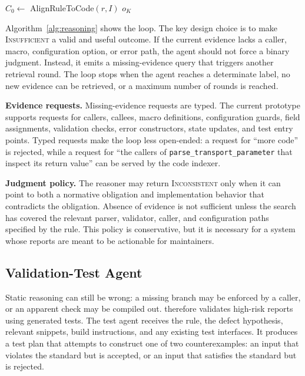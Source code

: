 \begin{algorithm}[t]
\small
\DontPrintSemicolon
{}
$C_0 \leftarrow$ AlignRuleToCode$(r,I)$\;
\Return $o_K$\;
\caption{Evidence-driven consistency reasoning.}
\label{alg:reasoning}
\end{algorithm}

Algorithm~\ref{alg:reasoning} shows the loop. The key design choice is to make
\textsc{Insufficient} a valid and useful outcome. If the current evidence lacks
a caller, macro, configuration option, or error path, the agent should not force
a binary judgment. Instead, it emits a missing-evidence query that triggers
another retrieval round. The loop stops when the agent reaches a determinate
label, no new evidence can be retrieved, or a maximum number of rounds is
reached.

\textbf{Evidence requests.}
Missing-evidence requests are typed. The current prototype supports requests
for callers, callees, macro definitions, configuration guards, field
assignments, validation checks, error constructors, state updates, and test
entry points. Typed requests make the loop less open-ended: a request for
``more code'' is rejected, while a request for ``the callers of
\texttt{parse\_transport\_parameter} that inspect its return value'' can be
served by the code indexer.

\textbf{Judgment policy.}
The reasoner may return \textsc{Inconsistent} only when it can point to both a
normative obligation and implementation behavior that contradicts the
obligation. Absence of evidence is not sufficient unless the search has covered
the relevant parser, validator, caller, and configuration paths specified by
the rule. This policy is conservative, but it is necessary for a system whose
reports are meant to be actionable for maintainers.

\subsection{Validation-Test Agent}
\label{sec:testagent}

Static reasoning can still be wrong: a missing branch may be enforced by a
caller, or an apparent check may be compiled out. \tool{} therefore validates
high-risk reports using generated tests. The test agent receives the rule, the
defect hypothesis, relevant snippets, build instructions, and any existing test
interfaces. It produces a test plan that attempts to construct one of two
counterexamples: an input that violates the standard but is accepted, or an
input that satisfies the standard but is rejected.


